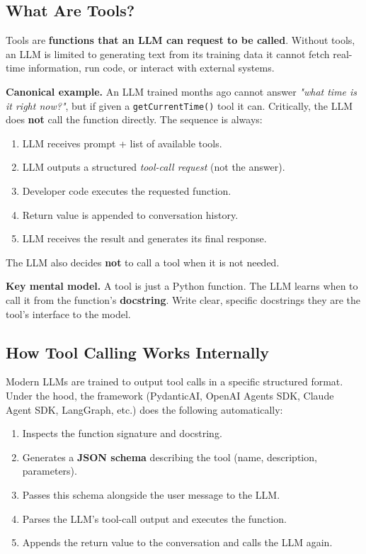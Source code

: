 \documentclass[a4paper,11pt]{article}
\begin{document}
\subsection{What Are Tools?}

Tools are \textbf{functions that an LLM can request to be called}.
Without tools, an LLM is limited to generating text from its training
data \textemdash{} it cannot fetch real-time information, run code,
or interact with external systems.

\textbf{Canonical example.} An LLM trained months ago cannot answer
\textit{"what time is it right now?"}, but if given a
\texttt{getCurrentTime()} tool it can. Critically, the LLM does
\textbf{not} call the function directly. The sequence is always:

\begin{enumerate}[noitemsep, leftmargin=1.4em]
  \item LLM receives prompt + list of available tools.
  \item LLM outputs a structured \textit{tool-call request} (not the
        answer).
  \item Developer code executes the requested function.
  \item Return value is appended to conversation history.
  \item LLM receives the result and generates its final response.
\end{enumerate}

The LLM also decides \textbf{not} to call a tool when it is not
needed.

\begin{ambercallout}
\textbf{Key mental model.}
A tool is just a Python function. The LLM learns when to call it from
the function's \textbf{docstring}. Write clear, specific docstrings
\textemdash{} they are the tool's interface to the model.
\end{ambercallout}

\subsection{How Tool Calling Works Internally}

Modern LLMs are trained to output tool calls in a specific structured
format. Under the hood, the framework (PydanticAI, OpenAI Agents SDK,
Claude Agent SDK, LangGraph, etc.) does the following automatically:

\begin{enumerate}[noitemsep, leftmargin=1.4em]
  \item Inspects the function signature and docstring.
  \item Generates a \textbf{JSON schema} describing the tool (name,
        description, parameters).
  \item Passes this schema alongside the user message to the LLM.
  \item Parses the LLM's tool-call output and executes the function.
  \item Appends the return value to the conversation and calls the
        LLM again.
\end{enumerate}
\end{document}
